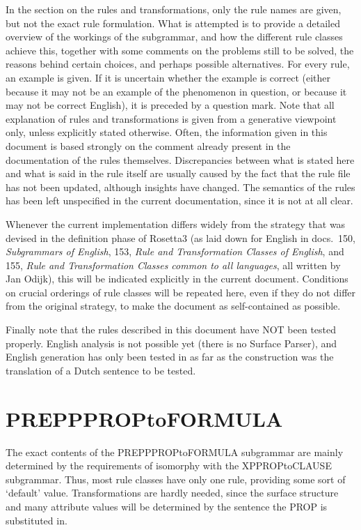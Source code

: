 In the section on the rules and transformations, only the rule names are given, 
but not the exact rule formulation. What is attempted 
is to provide a detailed overview of the workings of the subgrammar, and 
how the different rule classes achieve this,
together with some comments on the problems still to be solved, the reasons 
behind certain choices, and perhaps possible alternatives. For every rule, an 
example is given. If it is uncertain whether the example is correct (either 
because it may not be an example of the phenomenon in question, or because it 
may not be correct English), it is preceded by a question mark. Note that all 
explanation of rules and transformations is given from a generative viewpoint
only, unless explicitly stated otherwise. Often, the information given in this 
document is based strongly on the comment already present in the documentation 
of the rules themselves. Discrepancies between what is stated here and what is 
said in the rule itself are usually caused by the fact that the rule file has 
not  been updated, although insights have changed. The semantics of the rules 
has been left unspecified in the current documentation, since it is not at all 
clear.

Whenever the current implementation differs widely from the strategy that was 
devised in the definition phase of Rosetta3 (as laid down for English in docs.\ 
150, {\em Subgrammars of English\/}, 153, {\em Rule and Transformation Classes 
of English\/}, and 155, {\em Rule and Transformation Classes common to all 
languages\/}, all written by Jan Odijk), this will be indicated explicitly in 
the current document. Conditions on crucial orderings of rule classes will be 
repeated here, even if they do not differ from the original strategy, to make 
the document as self-contained as possible.

Finally note that the rules described in this document have NOT been tested 
properly. English analysis is not possible yet (there is no Surface Parser), and 
English generation has only been tested in as far as the construction was the 
translation of a Dutch sentence to be tested.

\newpage
\section{PREPPPROPtoFORMULA}
The exact contents of the PREPPPROPtoFORMULA subgrammar are mainly determined 
by the requirements of isomorphy with the XPPROPtoCLAUSE subgrammar. Thus, 
most rule classes have only one rule, providing some sort of 
`default' value. Transformations are hardly needed, since the surface structure 
and many attribute values will be determined by the sentence the PROP is 
substituted in. 

